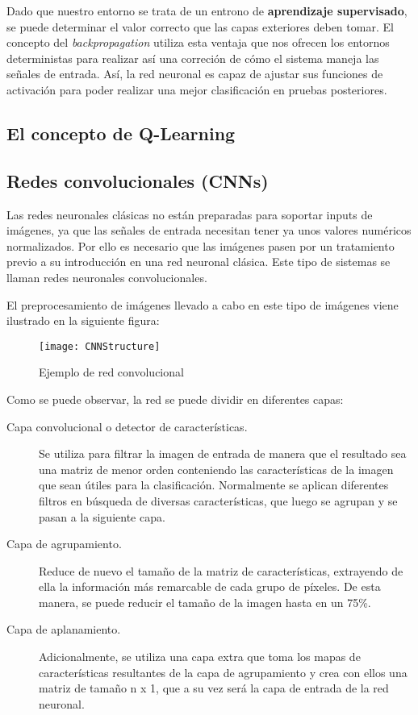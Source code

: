 \documentclass[11pt,spanish,listoffigures,listoftables]{tfgetsinf}
\begin{document}
Dado que nuestro entorno se trata de un entrono de \textbf{aprendizaje supervisado}, se puede determinar el valor correcto que las capas exteriores deben tomar. El concepto del \textit{backpropagation} utiliza esta ventaja que nos ofrecen los entornos deterministas para realizar así una correción de cómo el sistema maneja las señales de entrada. Así, la red neuronal es capaz de ajustar sus funciones de activación para poder realizar una mejor clasificación en pruebas posteriores.

\subsection{El concepto de Q-Learning}



\subsection{Redes convolucionales (CNNs)}

Las redes neuronales clásicas no están preparadas para soportar inputs de imágenes, ya que las señales de entrada necesitan tener ya unos valores numéricos normalizados. Por ello es necesario que las imágenes pasen por un tratamiento previo a su introducción en una red neuronal clásica. Este tipo de sistemas se llaman redes neuronales convolucionales.

El preprocesamiento de imágenes llevado a cabo en este tipo de imágenes viene ilustrado en la siguiente figura:

\begin{figure}[h]
	\centering
	\texttt{[image: CNNStructure]}
	\caption{Ejemplo de red convolucional}
	
\end{figure}

Como se puede observar, la red se puede dividir en diferentes capas:

\begin{description}
	\item[Capa convolucional o detector de características.] Se utiliza para filtrar la imagen de entrada de manera que el resultado sea una matriz de menor orden conteniendo las características de la imagen que sean útiles para la clasificación. Normalmente se aplican diferentes filtros en búsqueda de diversas características, que luego se agrupan y se pasan a la siguiente capa.
	\item [Capa de agrupamiento.] Reduce de nuevo el tamaño de la matriz de características, extrayendo de ella la información más remarcable de cada grupo de píxeles. De esta manera, se puede reducir el tamaño de la imagen hasta en un 75\%.
	\item[Capa de aplanamiento.] Adicionalmente, se utiliza una capa extra que toma los mapas de características resultantes de la capa de agrupamiento y crea con ellos una matriz de tamaño n x 1, que a su vez será la capa de entrada de la red neuronal.
\end{description}
\end{document}
